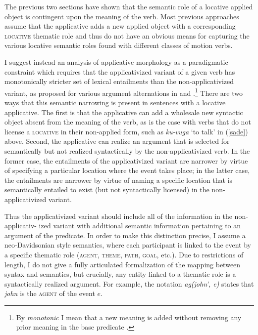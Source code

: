 \documentclass[output=paper]{langsci/langscibook}
\begin{document}
The previous two sections have shown that the semantic role of a locative applied object is contingent upon the meaning of the verb. Most previous approaches assume that the applicative adds a new applied object with a corresponding {\scshape locative} thematic role and thus do not have an obvious means for capturing the various locative semantic roles found with different classes of motion verbs.

I suggest instead an analysis of applicative morphology as a paradigmatic constraint which requires that the applicativized variant of a given verb has monotonically stricter set of lexical entailments than the non-applicativized variant, as proposed for various argument alternations in \citet{ackermanmoore:2001} and \citet{beavers:2010b}.\footnote{By \emph{monotonic} I mean that a new meaning is added without removing any prior meaning in the base predicate \citep{akg:2007, akg:2012}.} There are two ways that this semantic narrowing is present in sentences with a locative applicative. The first is that the applicative can add a wholesale new syntactic object absent from the meaning of the verb, as is the case with verbs that do not license a {\scshape locative} in their non-applied form, such as \emph{ku-vuga} `to talk'  in (\ref{sade}) above. Second, the applicative can realize an argument that is selected for semantically but not realized syntactically by the non-applicativized verb. In the former case, the entailments of the applicativized variant are narrower by virtue of specifying a particular location where the event takes place; in the latter case, the entailments are narrower by virtue of naming a specific location that is semantically entailed to exist (but not syntactically licensed) in the non-applicativized variant. 
 
 Thus the applicativized variant should include all of the information in the non-applicativ- ized variant with additional semantic information pertaining to an argument of the predicate. In order to make this distinction precise, I assume a neo-Davidsonian style semantics, where each participant is linked to the event by a specific thematic role ({\scshape agent, theme, path, goal,} etc.). Due to restrictions of length, I do not give a fully articulated formalization of the mapping between syntax and semantics, but crucially, any entity linked to a thematic role is a syntactically realized argument. For example, the notation \emph{ag(john', e)} states that  \emph{john} is the {\scshape agent} of the event $e$.
	 
\end{document}
